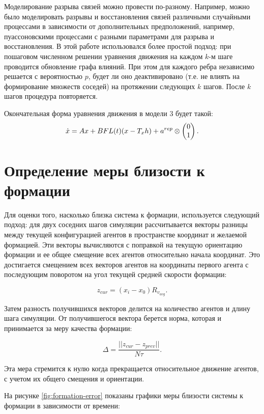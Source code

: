 Моделирование разрыва связей можно провести по-разному. Например, можно было моделировать разрывы и восстановления связей различными случайными процессами в зависимости от дополнительных предположений, например, пуассоновскими процессами с разными параметрами для разрыва и восстановления. В этой работе использовался более простой подход: при пошаговом
численном решении уравнения движения на каждом $k$-м шаге проводится обновление графа влияний. При этом для каждого ребра независимо решается с вероятностью $p$, будет ли оно деактивировано (т.е. не влиять на формирование множеств соседей) на протяжении следующих $k$ шагов. После $k$ шагов процедура повторяется.

Окончательная форма уравнения движения в модели 3 будет такой:
\begin{equation}
\dot{x}=Ax+BFL(t)(x-T_x h)+a^{rep}\otimes \veccol{0;1}.
\end{equation}

\section{Определение меры близости к формации}
\label{section:formation-measurement}

Для оценки того, насколько близка система к формации, используется следующий подход:
для двух соседних шагов симуляции рассчитывается векторы разницы между текущей конфигурацией агентов в пространстве координат и желаемой формацией. Эти векторы вычисляются с поправкой на текущую ориентацию формации и ее общее смещение всех агентов относительно начала координат. Это достигается смещением всех векторов агентов на координаты первого агента с последующим поворотом на угол текущей средней скорости формации:

\begin{equation}
z_{cur}=(x_i-x_0)R_{v_{avg}}.
\end{equation}

Затем разность получившихся векторов делится на количество агентов и длину шага симуляции. От получившегося вектора берется норма, которая и принимается за меру качества формации:

\begin{equation}
\Delta=\frac{||z_{cur}-z_{prev}||}{N\tau}.
\end{equation}

Эта мера стремится к нулю когда прекращается относительное движение агентов, с учетом их общего смещения и ориентации.

На рисунке \ref{fig:formation-error} показаны графики меры близости системы к формации в зависимости от времени:

